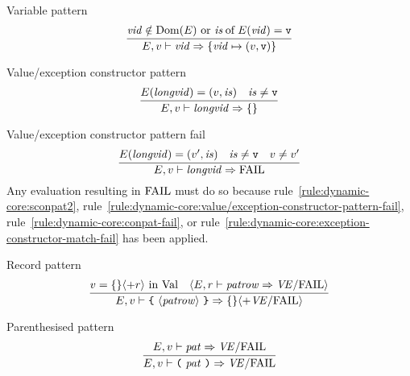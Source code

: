 \begin{inference-rule}{Variable pattern}
\begin{equation}\label{rule:dynamic-core:variable-pattern}
\vcenter{\infer{\E,\V\ts\vid\ra \{\vid\mapsto(\V,\isv)\} }
  {\hbox{$\vid\notin\Dom(\E)$ or $\of{\is}{\E(\vid)} = \isv$}}}
\end{equation}
\end{inference-rule}

\begin{inference-rule}{Value/exception constructor pattern}
\begin{equation}\label{rule:dynamic-core:value/exception-constructor-pattern}
\vcenter{\infer{\E,\V\ts\longvid\ra\emptymap}
  {\E(\longvid)=(\V,\is)
    & \is\neq\isv}}
\end{equation}
\end{inference-rule}

\begin{inference-rule}{Value/exception constructor pattern fail}
\begin{equation}\label{rule:dynamic-core:value/exception-constructor-pattern-fail}
\vcenter{\infer{\E,\V\ts\longvid\ra\FAIL}
  {\E(\longvid)=(\V',\is)
    &\is\neq\isv
    &\V\neq\V'}}
\end{equation}
Any evaluation resulting in ${\rm FAIL}$ must do so because 
rule~\ref{rule:dynamic-core:sconpat2},
rule~\ref{rule:dynamic-core:value/exception-constructor-pattern-fail},
rule~\ref{rule:dynamic-core:conpat-fail},
or rule~\ref{rule:dynamic-core:exception-constructor-match-fail}
has been applied.
\end{inference-rule}

\begin{inference-rule}{Record pattern}
\begin{equation}\label{rule:dynamic-core:record-pattern}
\vcenter{\infer{\E,\V\ts\lttbrace\ \optional{\labpats}\ \rttbrace\ra\emptymap\optional{+\VE/\fail}}
    {\V=\emptymap\optional{+\r}\ \In\ \Val
      & \optional{\E,\r\ts\labpats\ra\VE/\fail}}}
\end{equation}
\end{inference-rule}

\begin{inference-rule}{Parenthesised pattern}
\begin{equation}\label{rule:dynamic-core:parenthesised-pattern}
\vcenter{\infer{\E,\V\ts\parpat\ra\VE/\fail}
  {\E,\V\ts\pat\ra\VE/\fail}}
\end{equation}
\end{inference-rule}

